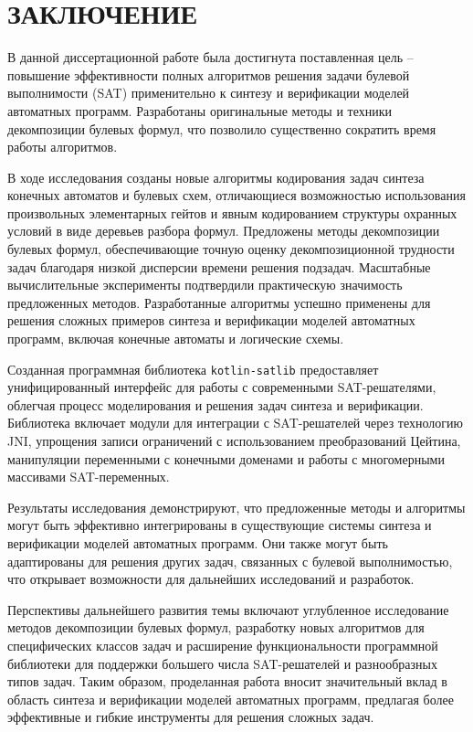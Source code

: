 \chapter*{ЗАКЛЮЧЕНИЕ}

В данной диссертационной работе была достигнута поставленная цель \--- повышение эффективности полных алгоритмов решения задачи булевой выполнимости (SAT) применительно к синтезу и верификации моделей автоматных программ. Разработаны оригинальные методы и техники декомпозиции булевых формул, что позволило существенно сократить время работы алгоритмов.

В ходе исследования созданы новые алгоритмы кодирования задач синтеза конечных автоматов и булевых схем, отличающиеся возможностью использования произвольных элементарных гейтов и явным кодированием структуры охранных условий в виде деревьев разбора формул. Предложены методы декомпозиции булевых формул, обеспечивающие точную оценку декомпозиционной трудности задач благодаря низкой дисперсии времени решения подзадач. Масштабные вычислительные эксперименты подтвердили практическую значимость предложенных методов. Разработанные алгоритмы успешно применены для решения сложных примеров синтеза и верификации моделей автоматных программ, включая конечные автоматы и логические схемы.

Созданная программная библиотека \verb/kotlin-satlib/ предоставляет унифицированный интерфейс для работы с современными SAT-решателями, облегчая процесс моделирования и решения задач синтеза и верификации. Библиотека включает модули для интеграции с SAT-решателей через технологию JNI, упрощения записи ограничений с использованием преобразований Цейтина, манипуляции переменными с конечными доменами и работы с многомерными массивами SAT-переменных.

Результаты исследования демонстрируют, что предложенные методы и алгоритмы могут быть эффективно интегрированы в существующие системы синтеза и верификации моделей автоматных программ.
Они также могут быть адаптированы для решения других задач, связанных с булевой выполнимостью, что открывает возможности для дальнейших исследований и разработок.

Перспективы дальнейшего развития темы включают углубленное исследование методов декомпозиции булевых формул, разработку новых алгоритмов для специфических классов задач и расширение функциональности программной библиотеки для поддержки большего числа SAT-решателей и разнообразных типов задач. Таким образом, проделанная работа вносит значительный вклад в область синтеза и верификации моделей автоматных программ, предлагая более эффективные и гибкие инструменты для решения сложных задач.
